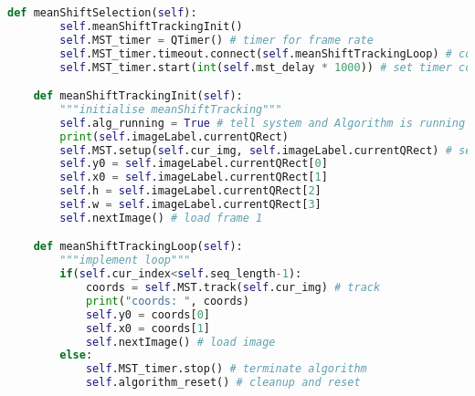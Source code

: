 \begin{lstlisting}[language=Python, caption={GUI Impementation Code}, captionpos=b, label={lst:gui}]
    def meanShiftSelection(self):
        self.meanShiftTrackingInit()
        self.MST_timer = QTimer() # timer for frame rate
        self.MST_timer.timeout.connect(self.meanShiftTrackingLoop) # connect timeouts to fetching next image
        self.MST_timer.start(int(self.mst_delay * 1000)) # set timer countdown rate

    def meanShiftTrackingInit(self):
        """initialise meanShiftTracking"""
        self.alg_running = True # tell system and Algorithm is running
        print(self.imageLabel.currentQRect)
        self.MST.setup(self.cur_img, self.imageLabel.currentQRect) # setup mean shift tracker with coords
        self.y0 = self.imageLabel.currentQRect[0]
        self.x0 = self.imageLabel.currentQRect[1]
        self.h = self.imageLabel.currentQRect[2]
        self.w = self.imageLabel.currentQRect[3]
        self.nextImage() # load frame 1

    def meanShiftTrackingLoop(self):
        """implement loop"""   
        if(self.cur_index<self.seq_length-1):
            coords = self.MST.track(self.cur_img) # track    
            print("coords: ", coords)
            self.y0 = coords[0]
            self.x0 = coords[1]
            self.nextImage() # load image    
        else:
            self.MST_timer.stop() # terminate algorithm
            self.algorithm_reset() # cleanup and reset
\end{lstlisting}


